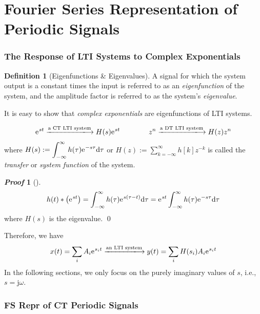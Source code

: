 \documentclass[10pt,UTF8]{article}
\newenvironment{definition box}
{\begin{tcolorbox}[colback=blue!5!white,colframe=blue!75!black,parbox=false,before upper=\par,before lower=\par]}
{\end{tcolorbox}}
\newenvironment{theorem box}
{\begin{tcolorbox}[colback=yellow!5!white,colframe=yellow!75!black,parbox=false,before upper=\par,before lower=\par]}
{\end{tcolorbox}}
\theoremstyle{definition}
\newtheorem{definition inner}{Definition}[section]
\newenvironment{definition}[1][]
{\begin{definition box}\begin{definition inner}[#1]\hfill\par}
{\end{definition inner}\end{definition box}}
\theoremstyle{plain}
\newtheorem{theorem inner}{Theorem}[section]
\theoremstyle{definition}
\newtheorem*{proof inner}{\textit{Proof}}
\renewenvironment{proof}[1][]
{\begin{proof inner}[#1]\hfill\par}
{\qed\end{proof inner}}
\theoremstyle{remark}
\newcommand{\ju}{\mathrm{j}}  %
\newcommand{\e}{\mathrm{e}{\mkern 1 mu}}
\begin{document}
\part*{Fourier Series Representation of Periodic Signals}

\section{The Response of LTI Systems to Complex Exponentials}

\begin{definition}[Eigenfunctions \& Eigenvalues]
    A signal for which the system output is a
    constant times the input is referred to as an \emph{eigenfunction} of the system,
    and the amplitude factor is referred to as the system's \emph{eigenvalue}.
\end{definition}

It is easy to show that \emph{complex exponentials} are eigenfunctions of LTI systems.

\begin{equation*}
    \e^{s t} \xlongrightarrow{\text{a CT LTI system}} H(s) \e^{s t}
    \qquad\qquad
    z^{n} \xlongrightarrow{\text{a DT LTI system}} H(z) z^n
\end{equation*}
where $\displaystyle H(s) :=
\int_{-\infty}^{\infty} h(\tau) \e^{-s \tau} \dd\tau$ or
$\displaystyle H(z) := \sum_{k=-\infty}^{\infty}h[k]z^{-k}$
is called the \emph{transfer} or
\emph{system function} of the system.
\begin{proof}
    \begin{equation*}
        h(t) \ast \left(\e^{s t}\right) = 
        \int_{-\infty}^{\infty} h(\tau) \e^{s (\tau - t)} \dd\tau =
        \e^{s t} \int_{-\infty}^{\infty} h(\tau) \e^{-s \tau} \dd\tau
    \end{equation*}
    where $H(s)$ is the eigenvalue.
\end{proof}

Therefore, we have
\begin{equation*}
    x(t)=\sum_i A_i \e^{s_i t} 
    \xlongrightarrow{\text{an LTI system}}
    y(t)=\sum_i H(s_i) A_i \e^{s_i t}
\end{equation*}
In the following sections,
we only focus on the purely imaginary values of $s$, i.e., $s = \ju\omega$.

\section{FS Repr of CT Periodic Signals}
\end{document}

